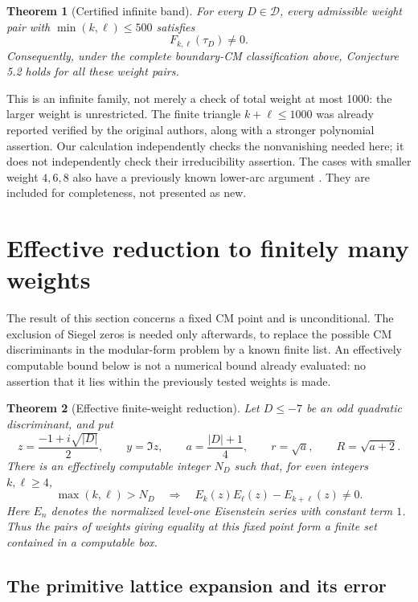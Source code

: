 \documentclass[11pt]{article}
\newtheorem{theorem}{Theorem}[section]
\begin{document}
\begin{theorem}[Certified infinite band]\label{thm:band}
For every $D\in\mathcal D$, every admissible weight pair with $\min(k,\ell)\le500$ satisfies
\[
 F_{k,\ell}(\tau_D)\ne0.
\]
Consequently, under the complete boundary-CM classification above, Conjecture 5.2 holds for all these weight pairs.
\end{theorem}

This is an infinite family, not merely a check of total weight at most 1000: the larger weight is unrestricted. The finite triangle $k+\ell\le1000$ was already reported verified by the original authors, along with a stronger polynomial assertion. Our calculation independently checks the nonvanishing needed here; it does not independently check their irreducibility assertion. The cases with smaller weight $4,6,8$ also have a previously known lower-arc argument \cite{RVY}. They are included for completeness, not presented as new.

\section{Effective reduction to finitely many weights}
\label{sec:finite-weight-reduction}

The result of this section concerns a fixed CM point and is unconditional.
The exclusion of Siegel zeros is needed only afterwards, to replace the
possible CM discriminants in the modular-form problem by a known finite list.
An effectively computable bound below is not a numerical bound already
evaluated: no assertion that it lies within the previously tested weights is
made.

\begin{theorem}[Effective finite-weight reduction]
\label{thm:effective-finite-weight}
Let $D\leq -7$ be an odd quadratic discriminant, and put
\[
 z=\frac{-1+i\sqrt{|D|}}2,\qquad
 y=\Im z,\qquad a=\frac{|D|+1}{4},\qquad
 r=\sqrt a,\qquad R=\sqrt{a+2}.
\]
There is an effectively computable integer $N_D$ such that, for even
integers $k,\ell\geq4$,
\[
 \max(k,\ell)>N_D
 \quad\Longrightarrow\quad
 E_k(z)E_\ell(z)-E_{k+\ell}(z)\ne0.
\]
Here $E_n$ denotes the normalized level-one Eisenstein series with constant
term $1$.  Thus the pairs of weights giving equality at this fixed point
form a finite set contained in a computable box.
\end{theorem}

\subsection{The primitive lattice expansion and its error}
\end{document}
